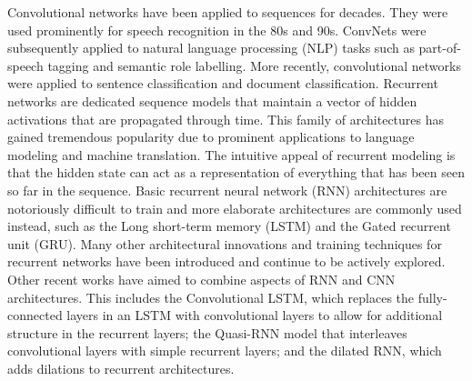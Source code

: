 \documentclass[12pt,a4paper,titlepage,openany]{report}
\begin{document}
Convolutional networks have been applied to sequences for decades. They were used prominently for speech recognition in the 80s and 90s. 
ConvNets were subsequently applied to natural language processing (NLP) tasks such as part-of-speech tagging and semantic role labelling. 
More recently, convolutional networks were applied to sentence classification and document classification. 
Recurrent networks are dedicated sequence models that maintain a vector of hidden activations that are propagated through time. 
This family of architectures has gained tremendous popularity due to prominent applications to language modeling and machine translation. 
The intuitive appeal of recurrent modeling is that the hidden state can act as a representation of everything that has been seen so far in the sequence. 
Basic recurrent neural network (RNN) architectures are notoriously difficult to train and more elaborate architectures are commonly used instead, such as the Long short-term memory (LSTM) and the Gated recurrent unit (GRU). 
Many other architectural innovations and training techniques for recurrent networks have been introduced and continue to be actively explored.
Other recent works have aimed to combine aspects of RNN and CNN architectures. This includes the Convolutional LSTM, which replaces the fully-connected layers in an LSTM with convolutional layers to allow for additional structure in the recurrent layers; the Quasi-RNN model that interleaves convolutional layers with simple recurrent layers; and the dilated RNN, which adds dilations to recurrent architectures.\\
\end{document}
